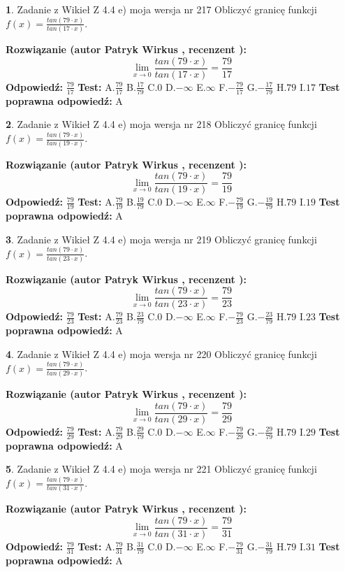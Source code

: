 \documentclass[12pt, a4paper]{article}
\theoremstyle{definition} %
\newtheorem{zad}{}
\newcommand{\zadStart}[1]{\begin{zad}#1\newline}
\newcommand{\zadStop}{\end{zad}}
\newcommand{\rozwStart}[2]{\noindent \textbf{Rozwiązanie (autor #1 , recenzent #2): }\newline}
\newcommand{\rozwStop}{\newline}
\newcommand{\odpStart}{\noindent \textbf{Odpowiedź:}\newline}
\newcommand{\odpStop}{\newline}
\newcommand{\testStart}{\noindent \textbf{Test:}\newline}
\newcommand{\testStop}{\newline}
\newcommand{\kluczStart}{\noindent \textbf{Test poprawna odpowiedź:}\newline}
\newcommand{\kluczStop}{\newline}
\begin{document}
\zadStart{Zadanie z Wikieł Z 4.4 e) moja wersja nr 217}
Obliczyć granicę funkcji $f(x)=\frac{tan(79\cdot x)}{tan(17\cdot x)}$.
\zadStop
\rozwStart{Patryk Wirkus}{}
$$\lim\limits_{x\to 0}\frac{tan(79\cdot x)}{tan(17\cdot x)}=
\frac{79}{17}$$
\rozwStop
\odpStart
$\frac{79}{17}$
\odpStop
\testStart
A.$\frac{79}{17}$
B.$\frac{17}{79}$
C.$0$
D.$-\infty$
E.$\infty$
F.$-\frac{79}{17}$
G.$-\frac{17}{79}$
H.$79$
I.$17$
\testStop
\kluczStart
A
\kluczStop



\zadStart{Zadanie z Wikieł Z 4.4 e) moja wersja nr 218}
Obliczyć granicę funkcji $f(x)=\frac{tan(79\cdot x)}{tan(19\cdot x)}$.
\zadStop
\rozwStart{Patryk Wirkus}{}
$$\lim\limits_{x\to 0}\frac{tan(79\cdot x)}{tan(19\cdot x)}=
\frac{79}{19}$$
\rozwStop
\odpStart
$\frac{79}{19}$
\odpStop
\testStart
A.$\frac{79}{19}$
B.$\frac{19}{79}$
C.$0$
D.$-\infty$
E.$\infty$
F.$-\frac{79}{19}$
G.$-\frac{19}{79}$
H.$79$
I.$19$
\testStop
\kluczStart
A
\kluczStop



\zadStart{Zadanie z Wikieł Z 4.4 e) moja wersja nr 219}
Obliczyć granicę funkcji $f(x)=\frac{tan(79\cdot x)}{tan(23\cdot x)}$.
\zadStop
\rozwStart{Patryk Wirkus}{}
$$\lim\limits_{x\to 0}\frac{tan(79\cdot x)}{tan(23\cdot x)}=
\frac{79}{23}$$
\rozwStop
\odpStart
$\frac{79}{23}$
\odpStop
\testStart
A.$\frac{79}{23}$
B.$\frac{23}{79}$
C.$0$
D.$-\infty$
E.$\infty$
F.$-\frac{79}{23}$
G.$-\frac{23}{79}$
H.$79$
I.$23$
\testStop
\kluczStart
A
\kluczStop



\zadStart{Zadanie z Wikieł Z 4.4 e) moja wersja nr 220}
Obliczyć granicę funkcji $f(x)=\frac{tan(79\cdot x)}{tan(29\cdot x)}$.
\zadStop
\rozwStart{Patryk Wirkus}{}
$$\lim\limits_{x\to 0}\frac{tan(79\cdot x)}{tan(29\cdot x)}=
\frac{79}{29}$$
\rozwStop
\odpStart
$\frac{79}{29}$
\odpStop
\testStart
A.$\frac{79}{29}$
B.$\frac{29}{79}$
C.$0$
D.$-\infty$
E.$\infty$
F.$-\frac{79}{29}$
G.$-\frac{29}{79}$
H.$79$
I.$29$
\testStop
\kluczStart
A
\kluczStop



\zadStart{Zadanie z Wikieł Z 4.4 e) moja wersja nr 221}
Obliczyć granicę funkcji $f(x)=\frac{tan(79\cdot x)}{tan(31\cdot x)}$.
\zadStop
\rozwStart{Patryk Wirkus}{}
$$\lim\limits_{x\to 0}\frac{tan(79\cdot x)}{tan(31\cdot x)}=
\frac{79}{31}$$
\rozwStop
\odpStart
$\frac{79}{31}$
\odpStop
\testStart
A.$\frac{79}{31}$
B.$\frac{31}{79}$
C.$0$
D.$-\infty$
E.$\infty$
F.$-\frac{79}{31}$
G.$-\frac{31}{79}$
H.$79$
I.$31$
\testStop
\kluczStart
A
\kluczStop
\end{document}
